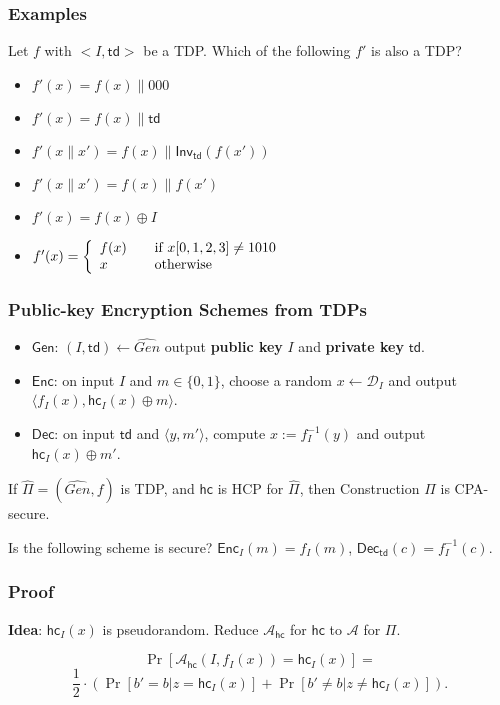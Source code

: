 \begin{frame}\frametitle{Examples}
\begin{exampleblock}{Let $f$ with $<I, \mathsf{td}>$ be a TDP. Which of the following $f'$ is also a TDP?}
\begin{itemize}
\item $f'(x) = f(x)\| 000$
\item $f'(x) = f(x)\| \mathsf{td}$
\item $f'(x\|x') = f(x)\|\mathsf{Inv}_{\mathsf{td}}(f(x'))$
\item $f'(x\|x') = f(x)\|f(x')$
\item $f'(x) = f(x) \oplus I$
\item $ f'(x) = \left\{
  \begin{array}{l l}
    f(x) & \quad \text{if $x[0,1,2,3] \neq 1010$}\\
    x & \quad \text{otherwise}\\
  \end{array} \right. $
\end{itemize}
\end{exampleblock}
\end{frame}
\begin{frame}\frametitle{Public-key Encryption Schemes from TDPs}
\begin{construction}
\begin{itemize}
\item $\mathsf{Gen}$: $(I, \mathsf{td}) \gets \widehat{Gen}$ output \textbf{public key} $I$ and \textbf{private key} $\mathsf{td}$.
\item $\mathsf{Enc}$: on input $I$ and $m \in \{0,1\}$, choose a random $x\gets \mathcal{D}_I$ and output $\langle f_I(x), \mathsf{hc}_I(x)\oplus m \rangle$.
\item $\mathsf{Dec}$: on input $\mathsf{td}$ and $\langle y, m'\rangle$, compute $x:= f^{-1}_I(y)$ and output $\mathsf{hc}_I(x)\oplus m'$.
\end{itemize}
\end{construction}
\begin{theorem}
If $\widehat{\Pi}=(\widehat{Gen},f)$ is TDP, and $\mathsf{hc}$ is HCP for $\widehat{\Pi}$, then Construction $\Pi$ is CPA-secure.
\end{theorem}
\begin{exampleblock}{Is the following scheme is secure?}
$\mathsf{Enc}_{I}(m) = f_I(m)$, $\mathsf{Dec}_{\mathsf{td}}(c) = f^{-1}_I(c)$.
\end{exampleblock}
\end{frame}
\begin{frame}\frametitle{Proof}
\textbf{Idea}: $\mathsf{hc}_I(x)$ is pseudorandom. Reduce $\mathcal{A}_{\mathsf{hc}}$ for $\mathsf{hc}$ to $\mathcal{A}$ for $\Pi$.
\begin{figure}
\begin{center}

\end{center}
\end{figure}
\[\Pr[\mathcal{A}_{\mathsf{hc}}(I,f_I(x))=\mathsf{hc}_I(x)] = \]
\[\frac{1}{2}\cdot (\Pr[b'=b|z=\mathsf{hc}_I(x)]+\Pr[b'\neq b|z\neq \mathsf{hc}_I(x)]).\]
\end{frame}
